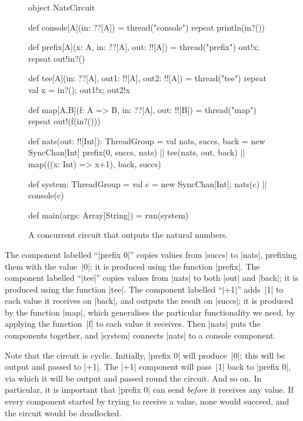 
\begin{figure}
\begin{scala}
object NatsCircuit{
  def console[A](in: ??[A]) = thread("console"){ repeat{ println(in?()) } }

  def prefix[A](x: A, in: ??[A], out: !![A]) = thread("prefix"){
    out!x; repeat{ out!in?() }
  }

  def tee[A](in: ??[A], out1: !![A], out2: !![A]) = thread("tee"){
    repeat{ val x = in?(); out1!x; out2!x }
  }

  def map[A,B](f: A => B, in: ??[A], out: !![B]) = thread("map"){
    repeat{ out!(f(in?())) }
  }

  def nats(out: !![Int]): ThreadGroup = {
    val nats, succs, back = new SyncChan[Int]
    prefix(0, succs, nats) || tee(nats, out, back) ||
      map(((x: Int) => x+1), back, succs)
  }

  def system: ThreadGroup = {
    val c = new SyncChan[Int]; nats(c) || console(c)
  }

  def main(args: Array[String]) = run(system)
}
\end{scala}
\caption{A concurrent circuit that outputs the natural numbers.}
\label{fig:NatsCircuit}
\end{figure}

The component labelled ``|prefix 0|'' copies values from |succs| to |nats|,
prefixing them with the value~|0|; it is produced using the function |prefix|.
The component labelled ``|tee|'' copies values from |nats| to both |out| and
|back|; it is produced using the function |tee|.  The component labelled
``|+1|'' adds~|1| to each value it receives on |back|, and outputs the result
on |succs|; it is produced by the function |map|, which generalises the
particular functionality we need, by applying the function~|f| to each value
it receives.  Then |nats| puts the components together, and |system| connects
|nats| to a console component.

Note that the circuit is cyclic.  Initially, |prefix 0| will produce~|0|; this
will be output and passed to |+1|.  The |+1| component will pass~|1| back to
|prefix 0|, via which it will be output and passed round the circuit.  And so
on.  In particular, it is important that |prefix 0| can send \emph{before} it
receives any value.  If every component started by trying to receive a value,
none would succeed, and the circuit would be deadlocked. 





